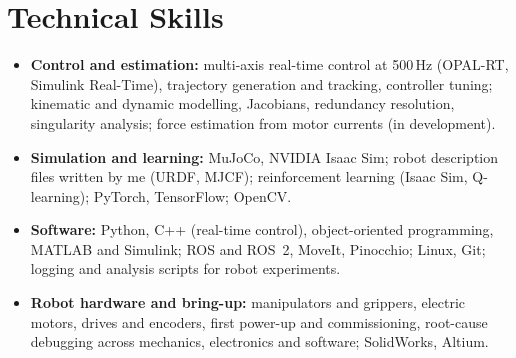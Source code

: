 \documentclass[10pt,a4paper]{article}
\begin{document}
\section{Technical Skills}
\begin{itemize}
\item \textbf{Control and estimation:} multi-axis real-time control at 500\,Hz (OPAL-RT, Simulink Real-Time), trajectory
generation and tracking, controller tuning; kinematic and dynamic modelling, Jacobians, redundancy resolution, singularity
analysis; force estimation from motor currents (in development).
\item \textbf{Simulation and learning:} MuJoCo, NVIDIA Isaac Sim; robot description files written by me (URDF, MJCF);
reinforcement learning (Isaac Sim, Q-learning); PyTorch, TensorFlow; OpenCV.
\item \textbf{Software:} Python, C++ (real-time control), object-oriented programming, MATLAB and Simulink; ROS and ROS~2,
MoveIt, Pinocchio; Linux, Git; logging and analysis scripts for robot experiments.
\item \textbf{Robot hardware and bring-up:} manipulators and grippers, electric motors, drives and encoders, first power-up
and commissioning, root-cause debugging across mechanics, electronics and software; SolidWorks, Altium.
\end{itemize}

\end{document}
